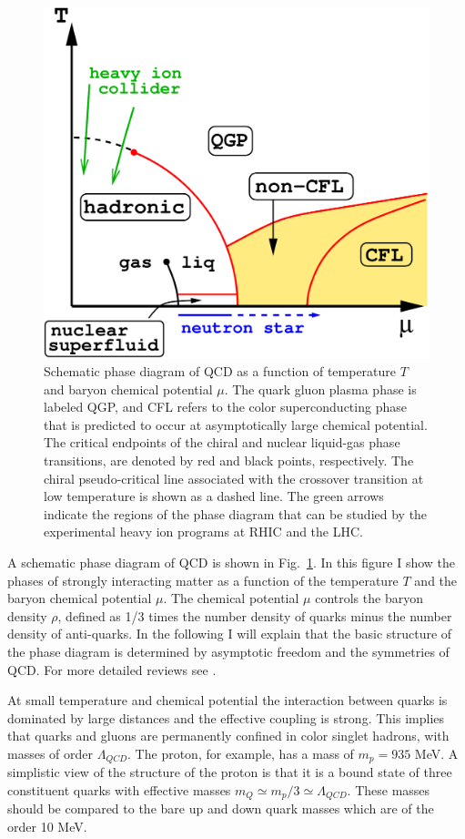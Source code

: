 \begin{figure}[t]
\bc\includegraphics[width=0.7 \textwidth]{Chapter2-figures/qcd_ms_high.pdf}\ec
\caption{\label{fig_qcd_phase}
Schematic phase diagram of QCD as a function of temperature $T$ and
baryon chemical potential $\mu$. The quark gluon plasma phase is 
labeled QGP, and CFL refers to the color superconducting phase 
that is predicted to occur at asymptotically large chemical potential. 
The critical endpoints of the chiral and nuclear liquid-gas phase 
transitions, are denoted by red and black points, respectively. 
The chiral pseudo-critical line associated with the crossover transition
at low temperature is shown as a dashed line.  The green arrows indicate
the regions of the phase diagram that can be studied by the experimental 
heavy ion programs at RHIC and the LHC.}
\end{figure}

 A schematic phase diagram of QCD is shown in Fig.~\ref{fig_qcd_phase}.
In this figure I show the phases of strongly interacting matter as a 
function of the temperature $T$ and the baryon chemical potential $\mu$. 
The chemical potential $\mu$ controls the baryon density $\rho$, defined 
as 1/3 times the number density of quarks minus the number density of 
anti-quarks. In the following I will explain that the basic structure 
of the phase diagram is determined by asymptotic freedom and the 
symmetries of QCD. For more detailed reviews see
\cite{Alford:2007xm,Adams:2012th,Braun-Munzinger:2015hba}.

 At small temperature and chemical potential the interaction between
quarks is dominated by large distances and the effective coupling is
strong. This implies that quarks and gluons are permanently confined in
color singlet hadrons, with masses of order $\Lambda_{QCD}$. The proton,
for example, has a mass of $m_p=935$ MeV. A simplistic view of the 
structure of the proton is that it is a bound state of three constituent 
quarks with effective masses $m_Q\simeq m_p/3\simeq \Lambda_{QCD}$. These
masses should be compared to the bare up and down quark masses which are 
of the order 10 MeV.

